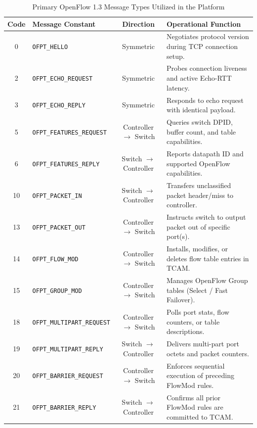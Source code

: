 \begin{table}[htbp]
\centering
\caption{Primary OpenFlow 1.3 Message Types Utilized in the Platform}
\label{tab:ofp_types_enumeration}
\small
\begin{tabularx}{\textwidth}{c l c X}
\toprule
\textbf{Code} & \textbf{Message Constant} & \textbf{Direction} & \textbf{Operational Function} \\
\midrule
0 & \texttt{OFPT\_HELLO} & Symmetric & Negotiates protocol version during TCP connection setup. \\
2 & \texttt{OFPT\_ECHO\_REQUEST} & Symmetric & Probes connection liveness and active Echo-RTT latency. \\
3 & \texttt{OFPT\_ECHO\_REPLY} & Symmetric & Responds to echo request with identical payload. \\
5 & \texttt{OFPT\_FEATURES\_REQUEST} & Controller $\to$ Switch & Queries switch DPID, buffer count, and table capabilities. \\
6 & \texttt{OFPT\_FEATURES\_REPLY} & Switch $\to$ Controller & Reports datapath ID and supported OpenFlow capabilities. \\
10 & \texttt{OFPT\_PACKET\_IN} & Switch $\to$ Controller & Transfers unclassified packet header/miss to controller. \\
13 & \texttt{OFPT\_PACKET\_OUT} & Controller $\to$ Switch & Instructs switch to output packet out of specific port(s). \\
14 & \texttt{OFPT\_FLOW\_MOD} & Controller $\to$ Switch & Installs, modifies, or deletes flow table entries in TCAM. \\
15 & \texttt{OFPT\_GROUP\_MOD} & Controller $\to$ Switch & Manages OpenFlow Group tables (Select / Fast Failover). \\
18 & \texttt{OFPT\_MULTIPART\_REQUEST} & Controller $\to$ Switch & Polls port stats, flow counters, or table descriptions. \\
19 & \texttt{OFPT\_MULTIPART\_REPLY} & Switch $\to$ Controller & Delivers multi-part port octets and packet counters. \\
20 & \texttt{OFPT\_BARRIER\_REQUEST} & Controller $\to$ Switch & Enforces sequential execution of preceding FlowMod rules. \\
21 & \texttt{OFPT\_BARRIER\_REPLY} & Switch $\to$ Controller & Confirms all prior FlowMod rules are committed to TCAM. \\
\bottomrule
\end{tabularx}
\end{table}

